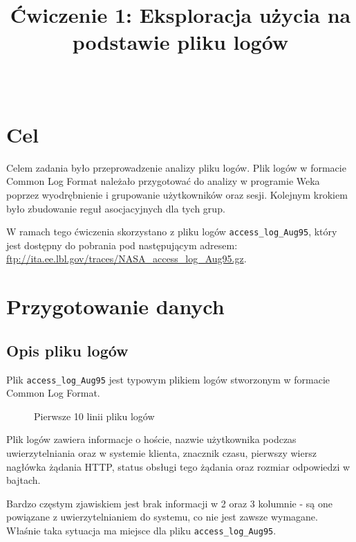 \documentclass{classrep}
\author{%
  \studentinfo{Paweł Jeziorski}{234066}\\
  \studentinfo{Karol Podlewski}{234106}%
}
\title{Ćwiczenie 1: Eksploracja użycia na podstawie pliku logów}
\begin{document}
\maketitle


\tableofcontents
{}
\newpage

\section{Cel}

Celem zadania było przeprowadzenie analizy pliku logów. Plik logów w formacie Common Log Format należało przygotować do analizy w programie Weka poprzez wyodrębnienie i grupowanie użytkowników oraz sesji. Kolejnym krokiem było zbudowanie reguł asocjacyjnych dla tych grup.

W ramach tego ćwiczenia skorzystano z pliku logów \verb|access_log_Aug95|, który jest dostępny do pobrania pod następującym adresem: \url{ftp://ita.ee.lbl.gov/traces/NASA\_access\_log\_Aug95.gz}.

\section{Przygotowanie danych}

    \subsection{Opis pliku logów}
    
    Plik \verb|access_log_Aug95| jest typowym plikiem logów stworzonym w formacie Common Log Format. 

    \begin{figure}[H] 
    	\begin{center}
        \caption{Pierwsze 10 linii pliku logów}
    	\end{center}
    \end{figure}

    Plik logów zawiera informacje o hoście, nazwie użytkownika podczas uwierzytelniania oraz w systemie klienta, znacznik czasu, pierwszy wiersz nagłówka żądania HTTP, status obsługi tego żądania oraz rozmiar odpowiedzi w bajtach. 
    
    Bardzo częstym zjawiskiem jest brak informacji w 2 oraz 3 kolumnie - są one powiązane z uwierzytelnianiem do systemu, co nie jest zawsze wymagane. Właśnie taka sytuacja ma miejsce dla pliku \verb|access_log_Aug95|.
    
\end{document}
